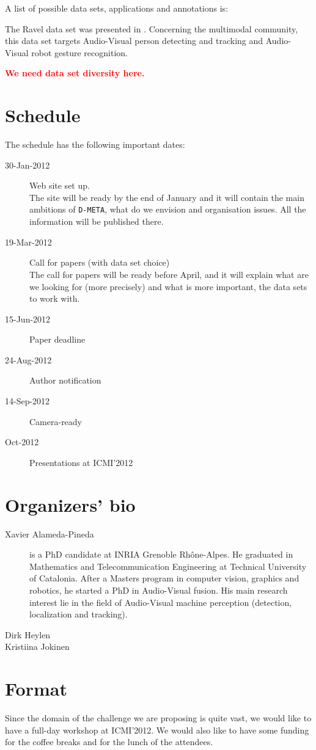 \documentclass{sig-alternate}
\newcommand{\todo}[1]{ \textcolor{red}{\bf #1}}
\begin{document}
A list of possible data sets, applications and annotations is:
\begin{description}
 \item [Ravel] The Ravel data set was presented in \cite{Ravel}. Concerning the multimodal community, this data set
targets Audio-Visual person detecting and tracking and Audio-Visual robot gesture recognition.
 \item \todo{We need data set diversity here.}
\end{description}

\section{Schedule}
The schedule has the following important dates:
\begin{description}
 \item[30-Jan-2012] Web site set up.\\
 The site will be ready by the end of January and it will contain the main ambitions of \texttt{D-META}, what do we
envision and organisation issues. All the information will be published there.
 \item[19-Mar-2012] Call for papers (with data set choice)\\
 The call for papers will be ready before April, and it will explain what are we looking for (more precisely) and what
is more important, the data sets to work with.
 \item[15-Jun-2012] Paper deadline
 \item[24-Aug-2012] Author notification
 \item[14-Sep-2012] Camera-ready
 \item[Oct-2012] Presentations at ICMI'2012
\end{description}


\section{Organizers' bio}
\begin{description}
 \item [Xavier Alameda-Pineda] is a PhD candidate at INRIA Grenoble Rh\^one-Alpes. He graduated in Mathematics and
Telecommunication Engineering at Technical University of Catalonia. After a Masters program in computer vision,
graphics and robotics, he started a PhD in Audio-Visual fusion. His main research interest lie in the field of
Audio-Visual machine perception (detection, localization and tracking).
 \item [Dirk Heylen]
 \item [Kristiina Jokinen]
\end{description}

\section{Format}
Since the domain of the challenge we are proposing is quite vast, we would like to have a full-day workshop at
ICMI'2012. We would also like to have some funding for the coffee breaks and for the lunch of the attendees.



\end{document}
